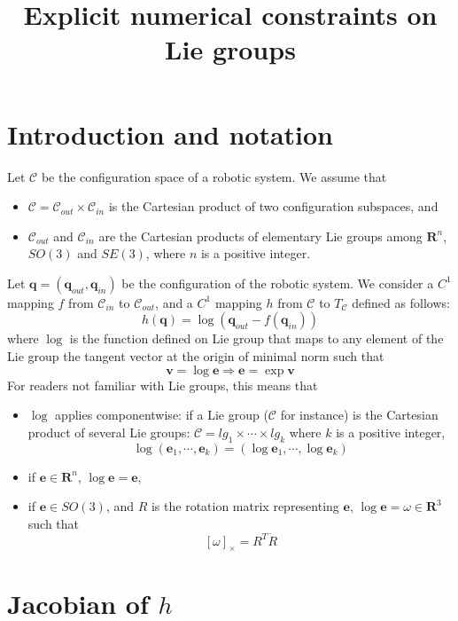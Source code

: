 \documentclass {article}
\title {Explicit numerical constraints on Lie groups}
\newcommand\reals{\mathbf{R}}
\newcommand\CS{\mathcal{C}}
\newcommand\conf{\mathbf{q}}
\begin{document}
\maketitle

\section {Introduction and notation}

Let $\CS$ be the configuration space of a robotic system. We assume that
\begin{itemize}
  \item $\CS=\CS_{out}\times\CS_{in}$ is the Cartesian product of two
    configuration subspaces, and
  \item $\CS_{out}$ and $\CS_{in}$ are the Cartesian products of elementary Lie
    groups among $\reals^n$, $SO(3)$ and $SE(3)$, where $n$ is a positive integer.
\end{itemize}
Let $\conf = (\conf_{out},\conf_{in})$ be the configuration of the robotic system.
We consider a $C^1$ mapping $f$ from $\CS_{in}$ to $\CS_{out}$, and a $C^1$ mapping $h$ from $\CS$ to $T_{\CS}$ defined as follows:
\begin {equation}\label{eq:def-h}
h (\conf) = \log (\conf_{out} - f (\conf_{in}))
\end {equation}
where $\log$ is the function defined on Lie group that maps to any element of
the Lie group the tangent vector at the origin of minimal norm such that
$$
\mathbf{v} = \log \mathbf{e} \Rightarrow \mathbf{e} = \exp \mathbf{v}
$$
For readers not familiar with Lie groups, this means that
\begin{itemize}
\item $\log$ applies componentwise: if a Lie group ($\CS$ for
  instance) is the Cartesian product of several Lie groups:
  $\CS=lg_1\times\cdots\times lg_{k}$ where $k$ is a positive integer,
  $$
  \log (\mathbf{e}_1,\cdots,\mathbf{e}_k) = (\log\mathbf{e}_1,\cdots,\log\mathbf{e}_k)
  $$
\item if $\mathbf{e}\in\reals^n$, $\log\mathbf{e} = \mathbf{e}$,
\item if $\mathbf{e}\in SO(3)$, and $R$ is the rotation matrix representing
$\mathbf{e}$, $\log\mathbf{e} = \omega\in \reals^3$ such that
$$
\left[\omega\right]_{\times} = R^T\dot{R}
$$
\end{itemize}

\section {Jacobian of $h$}
\end{document}
